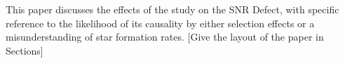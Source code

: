 \documentclass[preprint2,epsf,epsfig,graphics]{emulateapj}
\begin{document}
This paper discusses the effects of the study on the SNR Defect, with specific reference to the likelihood of its causality by either selection effects or a misunderstanding of star formation rates. {\color{red}[Give the layout of the paper in Sections]}

\clearpage

{}
\end{document}
